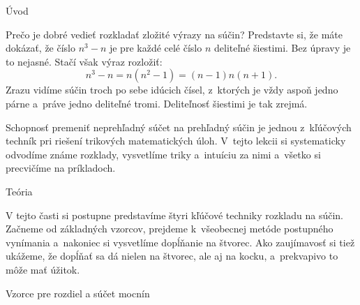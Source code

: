 





\sec Úvod

Prečo je dobré vedieť rozkladať zložité výrazy na súčin? Predstavte si, že máte dokázať, že číslo $n^3-n$ je pre každé celé číslo $n$ deliteľné šiestimi. Bez úpravy je to nejasné. Stačí však výraz rozložiť:
$$
n^3-n = n(n^2-1) = (n-1)n(n+1).
$$
Zrazu vidíme súčin troch po sebe idúcich čísel, z~ktorých je vždy aspoň jedno párne a~práve jedno deliteľné tromi. Deliteľnosť šiestimi je tak zrejmá.

Schopnosť premeniť neprehľadný súčet na prehľadný súčin je jednou z~kľúčových techník pri riešení trikových matematických úloh. V~tejto lekcii si systematicky odvodíme známe rozklady, vysvetlíme triky a~intuíciu za nimi a~všetko si precvičíme na príkladoch.

\sec Teória 

V tejto časti si postupne predstavíme štyri kľúčové techniky rozkladu na súčin. Začneme od základných vzorcov, prejdeme k~všeobecnej metóde postupného vynímania a~nakoniec si vysvetlíme dopĺňanie na štvorec. Ako zaujímavosť si tiež ukážeme, že dopĺňať sa dá nielen na štvorec, ale aj na kocku, a~prekvapivo to môže mať úžitok.

\secc Vzorce pre rozdiel a súčet mocnín



